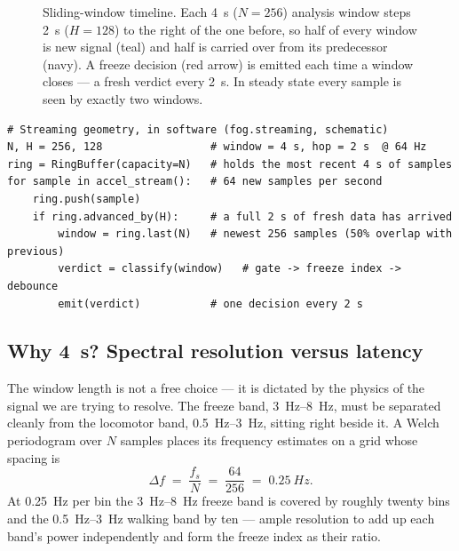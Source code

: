 \begin{figure}[H]
{}
\caption{Sliding-window timeline. Each \SI{4}{s} ($N{=}256$) analysis window steps
\SI{2}{s} ($H{=}128$) to the right of the one before, so half of every window is new
signal (teal) and half is carried over from its predecessor (navy). A freeze decision
(red arrow) is emitted each time a window closes --- a fresh verdict every \SI{2}{s}.
In steady state every sample is seen by exactly two windows.}
\label{fig:win-timeline}
\end{figure}

\begin{lstlisting}[style=py]
# Streaming geometry, in software (fog.streaming, schematic)
N, H = 256, 128                 # window = 4 s, hop = 2 s  @ 64 Hz
ring = RingBuffer(capacity=N)   # holds the most recent 4 s of samples
for sample in accel_stream():   # 64 new samples per second
    ring.push(sample)
    if ring.advanced_by(H):     # a full 2 s of fresh data has arrived
        window = ring.last(N)   # newest 256 samples (50% overlap with previous)
        verdict = classify(window)   # gate -> freeze index -> debounce
        emit(verdict)           # one decision every 2 s
\end{lstlisting}

\subsection{Why \SI{4}{s}? Spectral resolution versus latency}

The window length is not a free choice --- it is dictated by the physics of the
signal we are trying to resolve. The freeze band, \SIrange{3}{8}{Hz}, must be
separated cleanly from the locomotor band, \SIrange{0.5}{3}{Hz}, sitting right
beside it. A Welch periodogram over $N$ samples places its frequency estimates on a
grid whose spacing is
\[
  \Delta f \;=\; \frac{f_s}{N} \;=\; \frac{64}{256} \;=\; \SI{0.25}{Hz}.
\]
At \SI{0.25}{Hz} per bin the \SIrange{3}{8}{Hz} freeze band is covered by roughly
twenty bins and the \SIrange{0.5}{3}{Hz} walking band by ten --- ample resolution to
add up each band's power independently and form the freeze index as their ratio.


